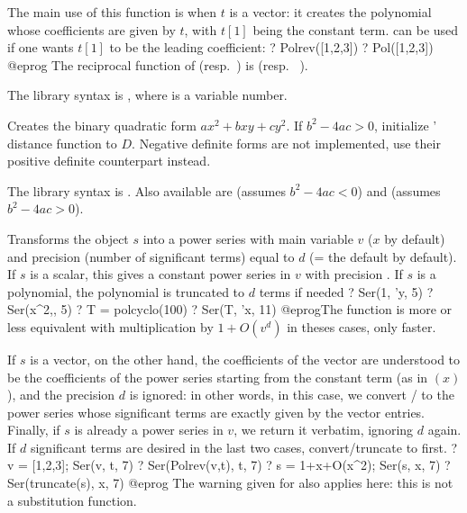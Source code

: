 The main use of this function is when $t$ is a vector: it creates the
polynomial whose coefficients are given by $t$, with $t[1]$ being the
constant term.  can be used if one wants $t[1]$ to be the leading
coefficient:
\bprog
? Polrev([1,2,3])
? Pol([1,2,3])
@eprog
The reciprocal function of  (resp.~) is  (resp.~
).

The library syntax is , where  is a variable number.

\label{se:Qfb}
Creates the binary quadratic form
$ax^2+bxy+cy^2$. If $b^2-4ac>0$, initialize ' distance
function to $D$. Negative definite forms are not implemented,
use their positive definite counterpart instead.

The library syntax is .
Also available are
 (assumes $b^2-4ac<0$) and
 (assumes $b^2-4ac>0$).

\label{se:Ser}
Transforms the object $s$ into a power series with main variable $v$
($x$ by default) and precision (number of significant terms) equal to
$d$ (= the default  by default). If $s$ is a
scalar, this gives a constant power series in $v$ with precision .
If $s$ is a polynomial, the polynomial is truncated to $d$ terms if needed
\bprog
? Ser(1, 'y, 5)
? Ser(x^2,, 5)
? T = polcyclo(100)
? Ser(T, 'x, 11)
@eprog\noindent The function is more or less equivalent with multiplication by
$1 + O(v^d)$ in theses cases, only faster.

If $s$ is a vector, on the other hand, the coefficients of the vector are
understood to be the coefficients of the power series starting from the
constant term (as in $(x)$), and the precision $d$ is ignored:
in other words, in this case, we convert  /  to the power
series whose significant terms are exactly given by the vector entries.
Finally, if $s$ is already a power series in $v$, we return it verbatim,
ignoring $d$ again. If $d$ significant terms are desired in the last two
cases, convert/truncate to  first.
\bprog
? v = [1,2,3]; Ser(v, t, 7)
? Ser(Polrev(v,t), t, 7)
? s = 1+x+O(x^2); Ser(s, x, 7)
? Ser(truncate(s), x, 7)
@eprog\noindent
The warning given for  also applies here: this is not a substitution
function.

